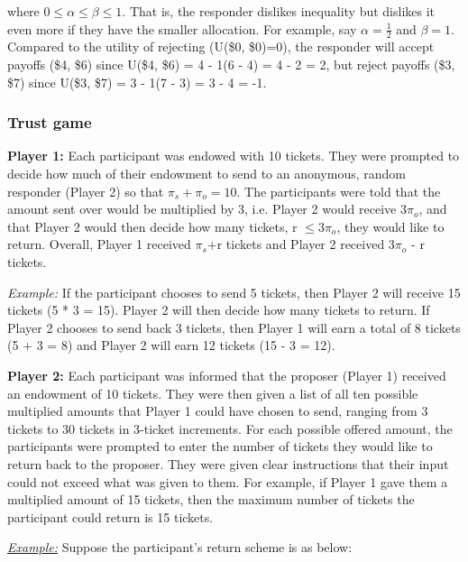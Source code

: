 \documentclass[12pt]{article}
\begin{document}
\noindent where $ 0 \leq \alpha \leq \beta \leq 1$. That is, the responder dislikes inequality but dislikes it even more if they have the smaller allocation. For example, say $\alpha = \frac{1}{2}$ and $\beta=1$. Compared to the utility of rejecting (U(\$0, \$0)=0), the responder will accept payoffs (\$4, \$6) since U(\$4, \$6) = 4 - 1(6 - 4) = 4 - 2 = 2, but reject payoffs (\$3, \$7) since U(\$3, \$7) = 3 - 1(7 - 3) = 3 - 4 = -1.

	
\subsubsection{Trust game}
\textbf{Player 1:} Each participant was endowed with 10 tickets. They were prompted to decide how much of their endowment to send to an anonymous, random responder (Player 2) so that \(\pi_{s} + \pi_{o} = 10\). The participants were told that the amount sent over would be multiplied by 3, i.e. Player 2 would receive 3\(\pi_{o}\), and that Player 2 would then decide how many tickets, r \(\leq 3\pi_{o}\), they would like to return. Overall, Player 1 received \(\pi_{s}\)+r tickets and Player 2 received 3\(\pi_{o}\) - r tickets.

\textit{Example:} If the participant chooses to send 5 tickets, then Player 2 will receive 15 tickets (5 * 3 = 15). Player 2 will then decide how many tickets to return. If Player 2 chooses to send back 3 tickets, then Player 1 will earn a total of 8 tickets (5 + 3 = 8) and Player 2 will earn 12 tickets (15 - 3 = 12).

\textbf{Player 2:} Each participant was informed that the proposer (Player 1) received an endowment of 10 tickets. They were then given a list of all ten possible multiplied amounts that Player 1 could have chosen to send, ranging from 3 tickets to 30 tickets in 3-ticket increments. For each possible offered amount, the participants were prompted to enter the number of tickets they would like to return back to the proposer. They were given clear instructions that their input could not exceed what was given to them. For example, if Player 1 gave them a multiplied amount of 15 tickets, then the maximum number of tickets the participant could return is 15 tickets.

\underline{\textit{Example:}} Suppose the participant\rq s return scheme is as below: \\
	
\end{document}
